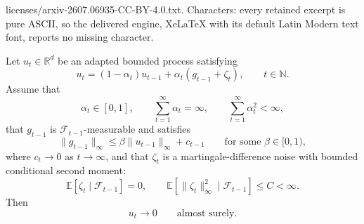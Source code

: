 \documentclass[10pt,a4paper]{amsart}
\newcommand{\E}{\mathbb E}
\newcommand{\R}{\mathbb{R}}
\newcommand{\cF}{\mathcal{F}}
\newcommand{\norm}[1]{\|#1\|}
\begin{document}
licenses/arxiv-2607.06935-CC-BY-4.0.txt. Characters: every retained excerpt is pure ASCII, so the delivered engine, XeLaTeX with its default Latin Modern text font, reports no missing character.
\begin{lemma}
\label{lem:q_learning_martingale_contraction}
Let \(u_t\in\R^d\) be an adapted bounded process satisfying
\begin{equation}
\label{eq:q_learning_abstract_martingale_recursion}
    u_t
    =
    (1-\alpha_t)u_{t-1}
    +
    \alpha_t(g_{t-1}+\zeta_t),
    \qquad t\in\mathbb{N}.
\end{equation}
Assume that
\[
    \alpha_t\in[0,1],
    \qquad
    \sum_{t=1}^{\infty}\alpha_t=\infty,
    \qquad
    \sum_{t=1}^{\infty}\alpha_t^2<\infty,
\]
that \(g_{t-1}\) is \(\cF_{t-1}\)-measurable and satisfies
\[
    \norm{g_{t-1}}_\infty
    \le
    \beta\norm{u_{t-1}}_\infty+c_{t-1}
    \qquad
    \text{for some }\beta\in[0,1),
\]
where \(c_t\to0\) as \(t\rightarrow\infty\), and that \(\zeta_t\) is a martingale-difference noise with bounded conditional second moment:
\[
    \E[\zeta_t\mid\cF_{t-1}]=0,
    \qquad
    \E[\norm{\zeta_t}_\infty^2\mid\cF_{t-1}]\le C<\infty.
\]
Then
\[
    u_t\to0
    \qquad
    \text{almost surely.}
\]
\end{lemma}
\end{document}
